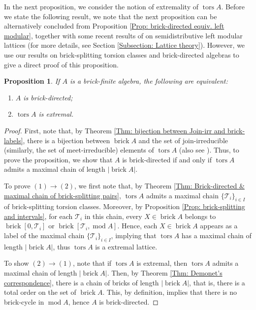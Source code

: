 \documentclass{amsart}
\theoremstyle{thmstyle}
\newtheorem{proposition}[thm]{Proposition}
\theoremstyle{exstyle}
\theoremstyle{defstyle}
\theoremstyle{remstyle}
\theoremstyle{remstyle}
\DeclareMathOperator*{\modu}{mod}
\DeclareMathOperator*{\brick}{brick}
\DeclareMathOperator*{\tors}{tors}
\begin{document}
In the next proposition, we consider the notion of extremality of $\tors A$. Before we state the following result, we note that the next proposition can be alternatively concluded from Proposition \ref{Prop: brick-directed equiv. left modular}, together with some recent results of \cite{Mu} on semidistributive left modular lattices (for more details, see Section \ref{Subsection: Lattice theory}). However, we use our results on brick-splitting torsion classes and brick-directed algebras to give a direct proof of this proposition.

\begin{proposition}\label{Prop: brick-directed equiv. extremal}
If $A$ is a brick-finite algebra, the following are equivalent:
\begin{enumerate}
    \item $A$ is brick-directed;
    \item $\tors A$ is extremal.
\end{enumerate}
\end{proposition}
\begin{proof}
First, note that, by Theorem \ref{Thm: bijection between Join-irr and brick-labels}, there is a bijection between $\brick A$ and the set of join-irreducible (similarly, the set of meet-irreducible) elements of $\tors A$ (also see \cite[Theorem 1.5]{BCZ}). Thus, to prove the proposition, we show that $A$ is brick-directed if and only if $\tors A$ admits a maximal chain of length $|{\brick A}|$. 

To prove $(1)\to (2)$, we first note that, by Theorem \ref{Thm: Brick-directed & maximal chain of brick-splitting pairs}, $\tors A$ admits a maximal chain $\{\mathcal{T}_i\}_{i\in I}$ of brick-splitting torsion classes. Moreover, by Proposition \ref{Prop: brick-splitting and intervals}, for each $\mathcal{T}_i$ in this chain, every $X\in \brick A$ belongs to $\brick[0,\mathcal{T}_i]$ or $\brick[\mathcal{T}_i,\modu A]$. Hence, each $X\in \brick A$ appears as a label of the maximal chain $\{\mathcal{T}_i\}_{i\in I}$, implying that $\tors A$ has a maximal chain of length $|{\brick A}|$, thus $\tors A$ is a extremal lattice. 


To show $(2)\to (1)$, note that if $\tors A$ is extremal, then $\tors A$ admits a maximal chain of length $|{\brick A}|$. Then, by Theorem \ref{Thm: Demonet's correspondence}, there is a chain of bricks of length $|{\brick A}|$, that is, there is a total order on the set of $\brick A$. This, by definition, implies that there is no brick-cycle in $\modu A$, hence $A$ is brick-directed.
\end{proof}
\end{document}
